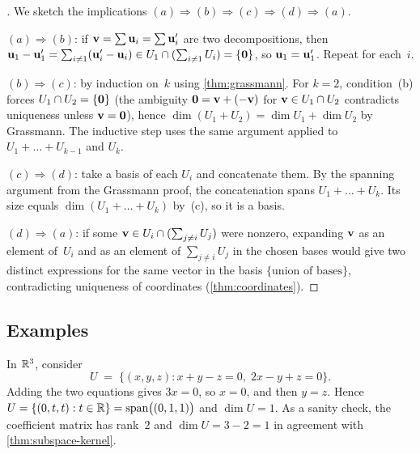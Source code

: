 \begin{proof}[]
We sketch the implications $(a) \Rightarrow (b) \Rightarrow (c) \Rightarrow (d) \Rightarrow (a)$.

$(a) \Rightarrow (b)$: if $\mathbf{v} = \sum \mathbf{u}_i = \sum \mathbf{u}'_i$ are
two decompositions, then $\mathbf{u}_1 - \mathbf{u}'_1 = \sum_{i \neq 1}(\mathbf{u}'_i - \mathbf{u}_i) \in U_1 \cap (\sum_{i \neq 1} U_i) = \{\mathbf{0}\}$,
so $\mathbf{u}_1 = \mathbf{u}'_1$. Repeat for each~$i$.

$(b) \Rightarrow (c)$: by induction on~$k$ using \cref{thm:grassmann}. For
$k = 2$, condition~(b) forces $U_1 \cap U_2 = \{\mathbf{0}\}$ (the
ambiguity $\mathbf{0} = \mathbf{v} + (-\mathbf{v})$ for $\mathbf{v} \in U_1 \cap U_2$
contradicts uniqueness unless $\mathbf{v} = \mathbf{0}$), hence
$\dim(U_1 + U_2) = \dim U_1 + \dim U_2$ by Grassmann. The inductive
step uses the same argument applied to $U_1 + \dots + U_{k-1}$ and
$U_k$.

$(c) \Rightarrow (d)$: take a basis of each $U_i$ and concatenate them.
By the spanning argument from the Grassmann proof, the concatenation
spans $U_1 + \dots + U_k$. Its size equals $\dim(U_1 + \dots + U_k)$
by~(c), so it is a basis.

$(d) \Rightarrow (a)$: if some
$\mathbf{v} \in U_i \cap (\sum_{j \neq i} U_j)$ were nonzero, expanding
$\mathbf{v}$ as an element of~$U_i$ and as an element of $\sum_{j \neq i} U_j$
in the chosen bases would give two distinct expressions for the same
vector in the basis $\{\text{union of bases}\}$, contradicting
uniqueness of coordinates (\cref{thm:coordinates}).
\end{proof}

\subsection*{Examples}

\begin{example}
\label{ex:subspace-from-system}
In $\mathbb{R}^3$, consider
\[
  U \;=\; \{(x, y, z) : x + y - z = 0,\; 2x - y + z = 0\}.
\]
Adding the two equations gives $3x = 0$, so $x = 0$, and then
$y = z$. Hence $U = \{(0, t, t) : t \in \mathbb{R}\} = \operatorname{span}\bigl((0, 1, 1)\bigr)$
and $\dim U = 1$. As a sanity check, the coefficient matrix has
rank~$2$ and $\dim U = 3 - 2 = 1$ in agreement with
\cref{thm:subspace-kernel}.
\end{example}

